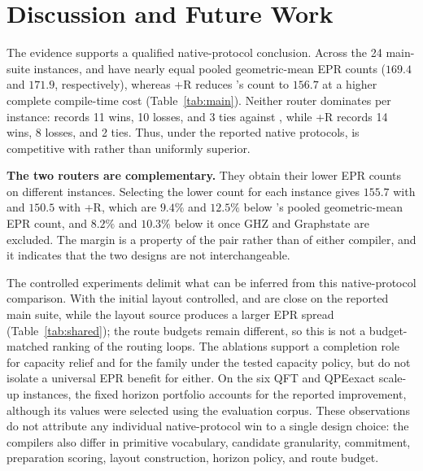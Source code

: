 \section{Discussion and Future Work}
\label{sec:discussion}

The evidence supports a qualified native-protocol conclusion. Across
the 24 main-suite instances, \PORTER{} and \dSABRE{} have nearly equal
pooled geometric-mean EPR counts ($169.4$ and $171.9$, respectively), whereas
\PORTER{}+R reduces \PORTER{}'s count to $156.7$ at a higher complete
compile-time cost (Table~\ref{tab:main}). Neither router dominates per
instance: \PORTER{} records 11 wins, 10 losses, and 3 ties against
\dSABRE{}, while \PORTER{}+R records 14 wins, 8 losses, and 2 ties. Thus,
under the reported native protocols, \PORTER{} is competitive with
\dSABRE{} rather than uniformly superior.

\textbf{The two routers are complementary.} They obtain their lower EPR
counts on different instances. Selecting
the lower count for each instance gives $155.7$ with \PORTER{} and $150.5$
with \PORTER{}+R, which are $9.4\%$ and $12.5\%$ below \dSABRE{}'s pooled
geometric-mean EPR count, and $8.2\%$ and $10.3\%$ below it once GHZ and
Graphstate are excluded. The margin is a property of the pair rather than of
either compiler, and it indicates that the two designs are not
interchangeable.

The controlled experiments delimit what can be inferred from this
native-protocol comparison. With the initial layout controlled, \PORTER{}
and \dSABRE{} are close on the reported main suite, while the layout source
produces a larger EPR spread (Table~\ref{tab:shared}); the route budgets
remain different, so this is not a budget-matched ranking of the routing
loops. The ablations support a completion role for capacity
relief and for the \TeleGate{} family under the tested capacity policy, but
do not isolate a universal EPR benefit for either. On the six QFT and
QPEexact scale-up instances, the fixed horizon portfolio accounts for the
reported improvement, although its values were selected using the evaluation
corpus. These observations do not attribute any individual
native-protocol win to a single design choice: the compilers also differ in
primitive vocabulary, candidate granularity, commitment, preparation
scoring, layout construction, horizon policy, and route budget.

